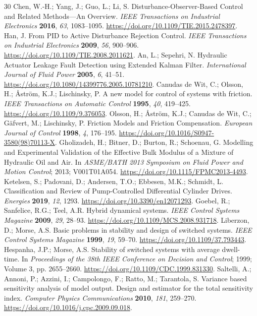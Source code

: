\documentclass[machines,article,submit,pdftex,moreauthors]{Definitions/mdpi}
\begin{document}
\begin{thebibliography}{30}
 Chen, W.-H.; Yang, J.; Guo, L.; Li, S. Disturbance-Observer-Based Control and Related Methods---An Overview. \emph{IEEE Transactions on Industrial Electronics} \textbf{2016}, \emph{63}, 1083--1095. \url{https://doi.org/10.1109/TIE.2015.2478397}.
 Han, J. From PID to Active Disturbance Rejection Control. \emph{IEEE Transactions on Industrial Electronics} \textbf{2009}, \emph{56}, 900--906. \url{https://doi.org/10.1109/TIE.2008.2011621}.
 An, L.; Sepehri, N. Hydraulic Actuator Leakage Fault Detection using Extended Kalman Filter. \emph{International Journal of Fluid Power} \textbf{2005}, \emph{6}, 41--51. \url{https://doi.org/10.1080/14399776.2005.10781210}.
 Canudas de Wit, C.; Olsson, H.; \AA{}str\"om, K.J.; Lischinsky, P. A new model for control of systems with friction. \emph{IEEE Transactions on Automatic Control} \textbf{1995}, \emph{40}, 419--425. \url{https://doi.org/10.1109/9.376053}.
 Olsson, H.; \AA{}str\"om, K.J.; Canudas de Wit, C.; G\"afvert, M.; Lischinsky, P. Friction Models and Friction Compensation. \emph{European Journal of Control} \textbf{1998}, \emph{4}, 176--195. \url{https://doi.org/10.1016/S0947-3580(98)70113-X}.
 Gholizadeh, H.; Bitner, D.; Burton, R.; Schoenau, G. Modelling and Experimental Validation of the Effective Bulk Modulus of a Mixture of Hydraulic Oil and Air. In \emph{ASME/BATH 2013 Symposium on Fluid Power and Motion Control}; 2013; V001T01A054. \url{https://doi.org/10.1115/FPMC2013-4493}.
 Ketelsen, S.; Padovani, D.; Andersen, T.O.; Ebbesen, M.K.; Schmidt, L. Classification and Review of Pump-Controlled Differential Cylinder Drives. \emph{Energies} \textbf{2019}, \emph{12}, 1293. \url{https://doi.org/10.3390/en12071293}.
 Goebel, R.; Sanfelice, R.G.; Teel, A.R. Hybrid dynamical systems. \emph{IEEE Control Systems Magazine} \textbf{2009}, \emph{29}, 28--93. \url{https://doi.org/10.1109/MCS.2008.931718}.
 Liberzon, D.; Morse, A.S. Basic problems in stability and design of switched systems. \emph{IEEE Control Systems Magazine} \textbf{1999}, \emph{19}, 59--70. \url{https://doi.org/10.1109/37.793443}.
 Hespanha, J.P.; Morse, A.S. Stability of switched systems with average dwell-time. In \emph{Proceedings of the 38th IEEE Conference on Decision and Control}; 1999; Volume 3, pp. 2655--2660. \url{https://doi.org/10.1109/CDC.1999.831330}.
 Saltelli, A.; Annoni, P.; Azzini, I.; Campolongo, F.; Ratto, M.; Tarantola, S. Variance based sensitivity analysis of model output. Design and estimator for the total sensitivity index. \emph{Computer Physics Communications} \textbf{2010}, \emph{181}, 259--270. \url{https://doi.org/10.1016/j.cpc.2009.09.018}.
\end{thebibliography}
\end{document}

